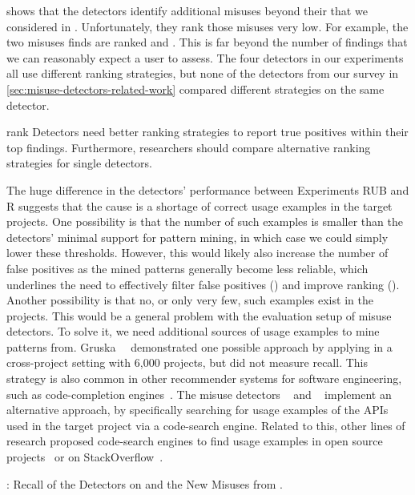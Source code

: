  shows that the detectors identify additional misuses beyond their  that we considered in .
Unfortunately, they rank those misuses very low.
For example, the two \MUBench misuses \DMMC finds are ranked  and .
This is far beyond the number of findings that we can reasonably expect a user to assess.
The four detectors in our experiments all use different ranking strategies, but none of the detectors from our survey in \autoref{sec:misuse-detectors-related-work} compared different strategies on the same detector.

\begin{obs}{rank}
  Detectors need better ranking strategies to report true positives within their top findings.
  Furthermore, researchers should compare alternative ranking strategies for single detectors.
\end{obs}

 The huge difference in the detectors' performance between Experiments RUB and R suggests that the cause is a shortage of correct usage examples in the target projects.
%
One possibility is that the number of such examples is smaller than the detectors' minimal support for pattern mining, in which case we could simply lower these thresholds.
However, this would likely also increase the number of false positives as the mined patterns generally become less reliable, which underlines the need to effectively filter false positives () and improve ranking ().
%
Another possibility is that no, or only very few, such examples exist in the projects.
This would be a general problem with the evaluation setup of misuse detectors.
To solve it, we need additional sources of usage examples to mine patterns from.
Gruska~\etal~\cite{GWZ10} demonstrated one possible approach by applying \Jadet in a cross-project setting with 6,000 projects, but did not measure recall.
This strategy is also common in other recommender systems for software engineering, such as code-completion engines~\cite{PLM15}.
The misuse detectors \CARMiner~\cite{TX09} and \Alattin~\cite{TX09b} implement an alternative approach, by specifically searching for usage examples of the APIs used in the target project via a code-search engine.
Related to this, other lines of research proposed code-search engines to find usage examples in open source projects~\cite{GFXM+10,MGPXF11} or on StackOverflow~\cite{PBDO+14}.

\begin{table}[tb]
  \centering
  \small
  \caption{: Recall of the Detectors on \MUBench and the New Misuses from .}
  
  \label{tab:ex3-results}
\end{table}

